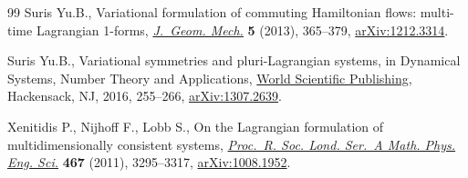 \documentclass[10pt,a4paper]{amsart}
\numberwithin{equation}{section}
\begin{document}
\begin{thebibliography}{99}
Suris Yu.B., Variational formulation of commuting {H}amiltonian flows:
 multi-time {L}agrangian 1-forms,
 \href{https://doi.org/10.3934/jgm.2013.5.365}{\textit{J.~Geom. Mech.}}
 \textbf{5} (2013), 365--379,
 \href{http://arxiv.org/abs/1212.3314}{arXiv:1212.3314}.

Suris Yu.B., Variational symmetries and pluri-{L}agrangian systems, in Dynamical
 Systems, Number Theory and Applications,
 \href{https://doi.org/10.1142/9789814699877_0013}{World Scientific
 Publishing}, Hackensack, NJ, 2016, 255--266,
 \href{http://arxiv.org/abs/1307.2639}{arXiv:1307.2639}.

Xenitidis P., Nijhoff F., Lobb S., On the {L}agrangian formulation of
 multidimensionally consistent systems,
 \href{https://doi.org/10.1098/rspa.2011.0124}{\textit{Proc.~R. Soc. Lond.
 Ser.~A Math. Phys. Eng. Sci.}} \textbf{467} (2011), 3295--3317,
 \href{http://arxiv.org/abs/1008.1952}{arXiv:1008.1952}.

\end{thebibliography}
\end{document}
